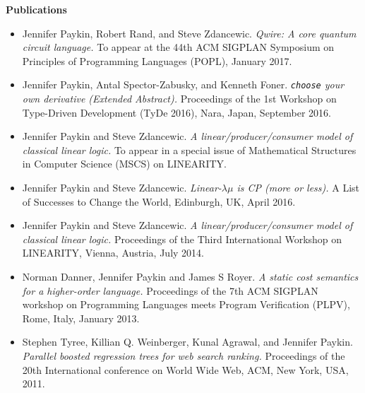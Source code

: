 \documentclass[letterpaper,11pt]{article}
\newcommand{\resheading}[1]{{\large \colorbox{mygrey}{\begin{minipage}{\textwidth}{\textbf{#1 \vphantom{p\^{E}}}}\end{minipage}}}}
\begin{document}
\resheading{Publications}
    \begin{itemize}

    \item{Jennifer Paykin, Robert Rand, and Steve Zdancewic. 
        \emph{Qwire: A core quantum circuit language.}
        To appear at the 44th ACM SIGPLAN Symposium
        on Principles of Programming Languages (POPL), January 2017.
        }

      \item{Jennifer Paykin, Antal Spector-Zabusky, and Kenneth Foner.
          \emph{\texttt{choose} your own derivative (Extended Abstract).}
          Proceedings of the 1st Workshop on Type-Driven Development (TyDe
          2016), Nara, Japan, September 2016.
        }

        \item{Jennifer Paykin and Steve Zdancewic.
        \emph{A linear/producer/consumer model of classical linear logic.}
        To appear in a special issue of Mathematical Structures in Computer
        Science (MSCS) on LINEARITY.
        }

        \item{Jennifer Paykin and Steve Zdancewic.
        \emph{Linear-$\lambda\mu$ is CP (more or less).}
        A List of Successes to Change the World, 
        Edinburgh, UK, April 2016.
        }

        \item{Jennifer Paykin and Steve Zdancewic.
        \emph{A linear/producer/consumer model of classical linear logic.}
        Proceedings of the Third International Workshop on LINEARITY,
        Vienna, Austria, July 2014.
        }

        \item{Norman Danner, Jennifer Paykin and James S Royer.
         \emph{A static cost semantics for a higher-order
         language.} Proceedings of the 7th ACM SIGPLAN workshop on Programming
         Languages meets Program Verification (PLPV), Rome, Italy, January 2013.}
        
        \item{Stephen Tyree, Killian Q. Weinberger, Kunal Agrawal, 
         and Jennifer Paykin. \emph{Parallel boosted regression trees 
         for web search ranking.} Proceedings of the 20th International
         conference on World Wide Web, ACM, New York, USA, 2011.}


    \end{itemize}
\end{document}
